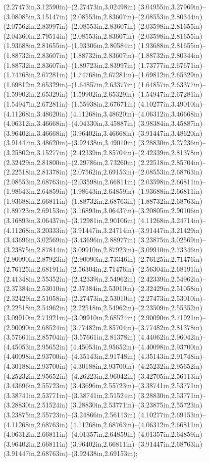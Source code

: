 (2.27473in,3.12590in)--(2.27473in,3.02498in) (3.04955in,3.27969in)--(3.08085in,3.15147in) (2.08553in,2.83607in)--(2.08553in,2.80344in) (2.07562in,2.83997in)--(2.08553in,2.83607in) (2.03598in,2.81655in)--(2.04360in,2.79514in) (2.08553in,2.83607in)--(2.03598in,2.81655in) (1.93688in,2.81655in)--(1.93306in,2.80584in) (1.93688in,2.81655in)--(1.88732in,2.83607in) (1.88732in,2.83607in)--(1.88732in,2.80344in) (1.88732in,2.83607in)--(1.89723in,2.83997in) (1.73777in,2.67671in)--(1.74768in,2.67281in) (1.74768in,2.67281in)--(1.69812in,2.65329in) (1.69812in,2.65329in)--(1.64857in,2.63377in) (1.64857in,2.63377in)--(1.59902in,2.65329in) (1.59902in,2.65329in)--(1.54947in,2.67281in) (1.54947in,2.67281in)--(1.55938in,2.67671in) (4.10277in,3.49010in)--(4.11268in,3.48620in) (4.11268in,3.48620in)--(4.06312in,3.46668in) (4.06312in,3.46668in)--(4.04330in,3.45887in) (3.98384in,3.45887in)--(3.96402in,3.46668in) (3.96402in,3.46668in)--(3.91447in,3.48620in) (3.91447in,3.48620in)--(3.92438in,3.49010in) (3.28830in,3.27236in)--(3.25802in,3.15277in) (2.42339in,2.85704in)--(2.42339in,2.81378in) (2.32429in,2.81800in)--(2.29786in,2.73260in) (2.22518in,2.85704in)--(2.22518in,2.81378in) (2.07562in,2.69153in)--(2.08553in,2.68763in) (2.08553in,2.68763in)--(2.03598in,2.66811in) (2.03598in,2.66811in)--(1.98643in,2.64859in) (1.98643in,2.64859in)--(1.93688in,2.66811in) (1.93688in,2.66811in)--(1.88732in,2.68763in) (1.88732in,2.68763in)--(1.89723in,2.69153in) (3.16893in,3.06437in)--(3.20805in,2.90106in) (3.16893in,3.06437in)--(3.12981in,2.90106in) (4.11268in,3.24714in)--(4.11268in,3.20333in) (3.91447in,3.24714in)--(3.91447in,3.21429in) (3.43696in,3.02569in)--(3.43696in,2.88977in) (3.23875in,3.02569in)--(3.23875in,2.87844in) (3.09910in,2.87923in)--(3.09910in,2.73346in) (2.90090in,2.87923in)--(2.90090in,2.73346in) (2.76125in,2.71476in)--(2.76125in,2.68191in) (2.56304in,2.71476in)--(2.56304in,2.68191in) (2.41348in,2.55352in)--(2.42339in,2.54962in) (2.42339in,2.54962in)--(2.37384in,2.53010in) (2.37384in,2.53010in)--(2.32429in,2.51058in) (2.32429in,2.51058in)--(2.27473in,2.53010in) (2.27473in,2.53010in)--(2.22518in,2.54962in) (2.22518in,2.54962in)--(2.23509in,2.55352in) (3.09910in,2.71921in)--(3.09910in,2.68524in) (2.90090in,2.71921in)--(2.90090in,2.68524in) (3.77482in,2.85704in)--(3.77482in,2.81378in) (3.57661in,2.85704in)--(3.57661in,2.81378in) (4.44062in,2.96042in)--(4.45053in,2.95652in) (4.45053in,2.95652in)--(4.40098in,2.93700in) (4.40098in,2.93700in)--(4.35143in,2.91748in) (4.35143in,2.91748in)--(4.30188in,2.93700in) (4.30188in,2.93700in)--(4.25232in,2.95652in) (4.25232in,2.95652in)--(4.26223in,2.96042in) (3.42705in,2.56113in)--(3.43696in,2.55723in) (3.43696in,2.55723in)--(3.38741in,2.53771in) (3.38741in,2.53771in)--(3.38741in,2.51524in) (3.28830in,2.53771in)--(3.28830in,2.51524in) (3.28830in,2.53771in)--(3.23875in,2.55723in) (3.23875in,2.55723in)--(3.24866in,2.56113in) (4.10277in,2.69153in)--(4.11268in,2.68763in) (4.11268in,2.68763in)--(4.06312in,2.66811in) (4.06312in,2.66811in)--(4.01357in,2.64859in) (4.01357in,2.64859in)--(3.96402in,2.66811in) (3.96402in,2.66811in)--(3.91447in,2.68763in) (3.91447in,2.68763in)--(3.92438in,2.69153in);
